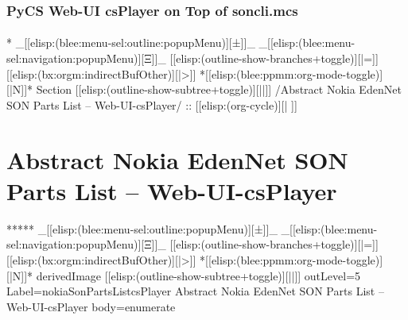\begin{verblatex}

\begin{frame}[fragile,label=part_webUiCsPlayerSoncli]
    \frametitle{PyCS Web-UI csPlayer on Top of soncli.mcs}
    \framesubtitle{}

    \tableofcontents

\end{frame}
\end{verblatex}



\begin{whenOrg}
*  _[[elisp:(blee:menu-sel:outline:popupMenu)][±]]_ _[[elisp:(blee:menu-sel:navigation:popupMenu)][Ξ]]_ [[elisp:(outline-show-branches+toggle)][|=]] [[elisp:(bx:orgm:indirectBufOther)][|>]] *[[elisp:(blee:ppmm:org-mode-toggle)][|N]]*  Section    [[elisp:(outline-show-subtree+toggle)][||]]   /Abstract Nokia EdenNet SON Parts List -- Web-UI-csPlayer/ ::  [[elisp:(org-cycle)][| ]]
\end{whenOrg}

\section{Abstract Nokia EdenNet SON Parts List -- Web-UI-csPlayer}

\begin{whenOrg}
*****  _[[elisp:(blee:menu-sel:outline:popupMenu)][±]]_ _[[elisp:(blee:menu-sel:navigation:popupMenu)][Ξ]]_ [[elisp:(outline-show-branches+toggle)][|=]] [[elisp:(bx:orgm:indirectBufOther)][|>]] *[[elisp:(blee:ppmm:org-mode-toggle)][|N]]*  derivedImage [[elisp:(outline-show-subtree+toggle)][||]] outLevel=5 Label=nokiaSonPartsListcsPlayer Abstract Nokia EdenNet SON Parts List -- Web-UI-csPlayer body=enumerate
\end{whenOrg}

